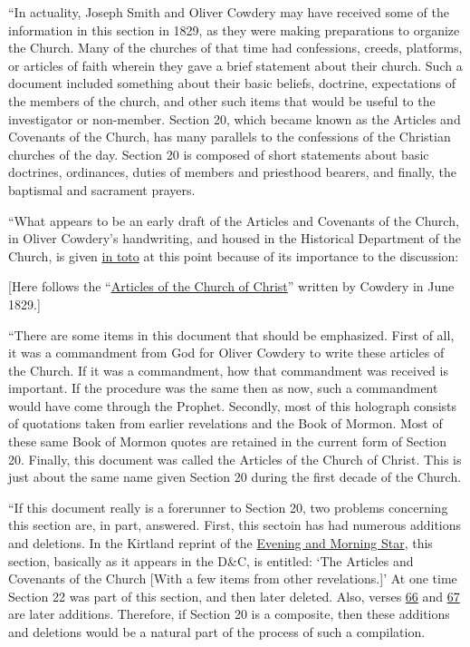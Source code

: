 			``In actuality, Joseph Smith and Oliver Cowdery may have received some of the information in this section in 1829, as they were making preparations to organize the Church. Many of the churches of that time had confessions, creeds, platforms, or articles of faith wherein they gave a brief statement about their church. Such a document included something about their basic beliefs, doctrine, expectations of the members of the church, and other such items that would be useful to the investigator or non-member. Section 20, which became known as the Articles and Covenants of the Church, has many parallels to the confessions of the Christian churches of the day. Section 20 is composed of short statements about basic doctrines, ordinances, duties of members and priesthood bearers, and finally, the baptismal and sacrament prayers.
			
			``What appears to be an early draft of the Articles and Covenants of the Church, in Oliver Cowdery's handwriting, and housed in the Historical Department of the Church, is given \uline{in toto} at this point because of its importance to the discussion:
			
			[Here follows the ``\hyperref[EMS-1828-1829-OC-JUNE-1829]{Articles of the Church of Christ}'' written by Cowdery in June 1829.]
			
			``There are some items in this document that should be emphasized. First of all, it was a commandment from God for Oliver Cowdery to write these articles of the Church. If it was a commandment, how that commandment was received is important. If the procedure was the same then as now, such a commandment would have come through the Prophet. Secondly, most of this holograph consists of quotations taken from earlier revelations and the Book of Mormon. Most of these same Book of Mormon quotes are retained in the current form of Section 20. Finally, this document was called the Articles of the Church of Christ. This is just about the same name given Section 20 during the first decade of the Church.
			
			``If this document really is a forerunner to Section 20, two problems concerning this section are, in part, answered. First, this sectoin has had numerous additions and deletions. In the Kirtland reprint of the \uline{Evening and Morning Star}, this section, basically as it appears in the D\&C, is entitled: `The Articles and Covenants of the Church [With a few items from other revelations.]' At one time Section 22 was part of this section, and then later deleted. Also, verses \hyperref[DC20-66]{66} and \hyperref[DC20-67]{67} are later additions. Therefore, if Section 20 is a composite, then these additions and deletions would be a natural part of the process of such a compilation.
			

